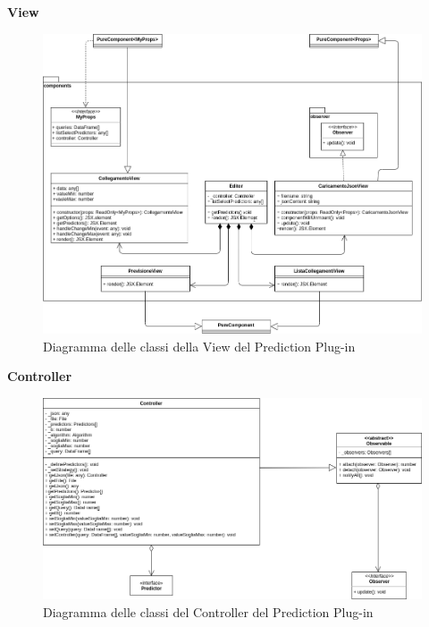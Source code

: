 \textbf{View}
\begin{figure}[H]
\centering
\includegraphics[scale=0.4]{../../Diagrams/Classes_diagrams/plugin_view.png}
\caption{Diagramma delle classi della View del Prediction Plug-in}
\end{figure}

\textbf{Controller}
\begin{figure}[H]
\centering
\includegraphics[scale=0.4]{../../Diagrams/Classes_diagrams/plugin_controller.png}
\caption{Diagramma delle classi del Controller del Prediction Plug-in}
\end{figure}

